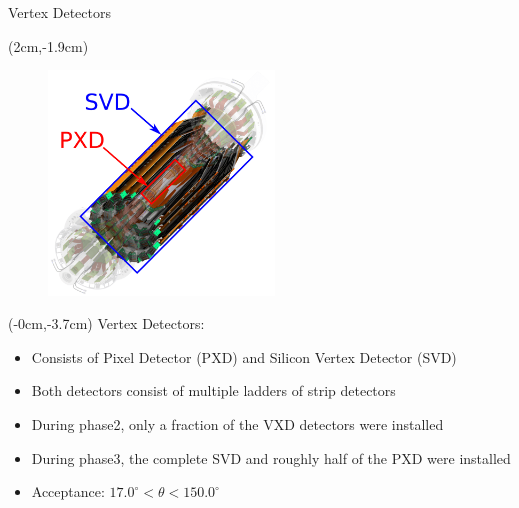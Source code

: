 \documentclass[8pt]{beamer}
\begin{document}
\begin{frame}{Vertex Detectors}
	
	
		\begin{textblock*}{10cm}(2cm,-1.9cm)
		\begin{figure}
			\includegraphics[width=6cm]{VBilder/PXD_SVD}
		\end{figure}
		
		
	\end{textblock*}
	
	
	\begin{textblock*}{10cm}(-0cm,-3.7cm)
		Vertex Detectors:		
			\begin{itemize}
				\item Consists of Pixel Detector (PXD) and Silicon Vertex Detector (SVD)
				\item Both detectors consist of multiple ladders of strip detectors
				\item During phase2, only a fraction of the VXD detectors were installed
				\item During phase3, the complete SVD and roughly half of the PXD were installed
				\item Acceptance: $17.0^{\circ} < \theta < 150.0^{\circ}$ 
			\end{itemize}
		



	\end{textblock*}
	
	

	
	
	
\end{frame}
\end{document}
